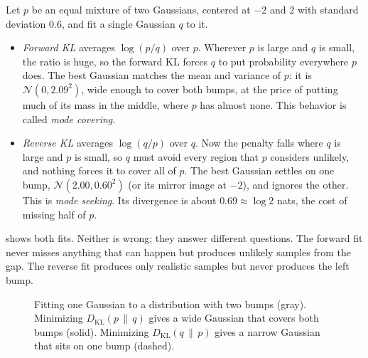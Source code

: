 Let $p$ be an equal mixture of two Gaussians, centered at $-2$ and $2$
with standard deviation $0.6$, and fit a single Gaussian $q$ to it.
\begin{itemize}
  \item \emph{Forward KL} averages $\log(p/q)$ over $p$. Wherever $p$ is
    large and $q$ is small, the ratio is huge, so the forward KL forces
    $q$ to put probability everywhere $p$ does. The best Gaussian matches
    the mean and variance of $p$: it is $\mathcal{N}(0, 2.09^2)$, wide
    enough to cover both bumps, at the price of putting much of its mass
    in the middle, where $p$ has almost none. This behavior is called
    \emph{mode covering}.
  \item \emph{Reverse KL} averages $\log(q/p)$ over $q$. Now the penalty
    falls where $q$ is large and $p$ is small, so $q$ must avoid every
    region that $p$ considers unlikely, and nothing forces it to cover all
    of $p$. The best Gaussian settles on one bump, $\mathcal{N}(2.00,
    0.60^2)$ (or its mirror image at $-2$), and ignores the other. This is
    \emph{mode seeking}. Its divergence is about $0.69 \approx \log 2$
    nats, the cost of missing half of $p$.
\end{itemize}
 shows both fits. Neither is wrong; they
answer different questions. The forward fit never misses anything that
can happen but produces unlikely samples from the gap. The reverse fit
produces only realistic samples but never produces the left bump.

\begin{figure}[ht]
  \centering
  \caption{Fitting one Gaussian to a distribution with two bumps (gray).
    Minimizing $D_{\mathrm{KL}}(p \,\|\, q)$ gives a wide Gaussian that
    covers both bumps (solid). Minimizing $D_{\mathrm{KL}}(q \,\|\, p)$
    gives a narrow Gaussian that sits on one bump (dashed).}
  \label{fig:ch07-kl-direction}
\end{figure}

